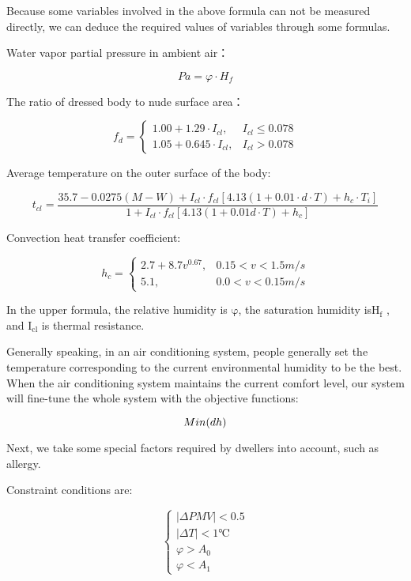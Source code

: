 \documentclass{mcmthesis}
\begin{document}
				Because some variables involved in the above formula can not be measured directly, we can deduce the required values of variables through some formulas.
				
				Water vapor partial pressure in ambient air：
				
				\begin{equation}
					Pa = \varphi \cdot H_f
				\end{equation}
				
				The ratio of dressed body to nude surface area：
				
				$$
				f_d =
				\begin{cases}
				1.00+1.29 \cdot I_{cl},  & I_{cl} \leq 0.078 \\
				1.05+0.645 \cdot I_{cl}, & I_{cl} > 0.078
				\end{cases}
				$$
				
				Average temperature on the outer surface of the body:
				
				\begin{equation}
				t_{cl} = \frac{35.7-0.0275(M-W)+I_{cl} \cdot f_{cl}[4.13(1+0.01 \cdot d \cdot T)+h_c \cdot T_i]}{1+I_{cl} \cdot f_{cl}[4.13(1+0.01d \cdot T)+h_c]}
				\end{equation}
				
				Convection heat transfer coefficient:
				
				$$
				h_c =
				\begin{cases}
				2.7+8.7v^{0.67},  & 0.15 < v < 1.5 m/s\\
				5.1, & 0.0 < v < 0.15 m/s
				\end{cases}
				$$
				
				In the upper formula, the relative humidity is $\mathrm{\varphi}$, the saturation humidity is$\mathrm{H_f}$ , and $\mathrm{I_{cl}}$ is thermal resistance.
				
				Generally speaking, in an air conditioning system, people generally set the temperature corresponding to the current environmental humidity to be the best. When the air conditioning system maintains the current comfort level, our system will fine-tune the whole system with the objective functions:
				
				$$
				Min(dh)\\
				$$
				
				Next, we take some special factors required by dwellers into account, such as allergy.
				
				Constraint conditions are:
				
				$$
				\begin{cases}
				|\Delta PMV| < 0.5 \\
				|\Delta T| < 1 \text{℃ } \\
				\varphi > A_0 \\
				\varphi < A_1
				\end{cases}
				$$
				
\end{document}
